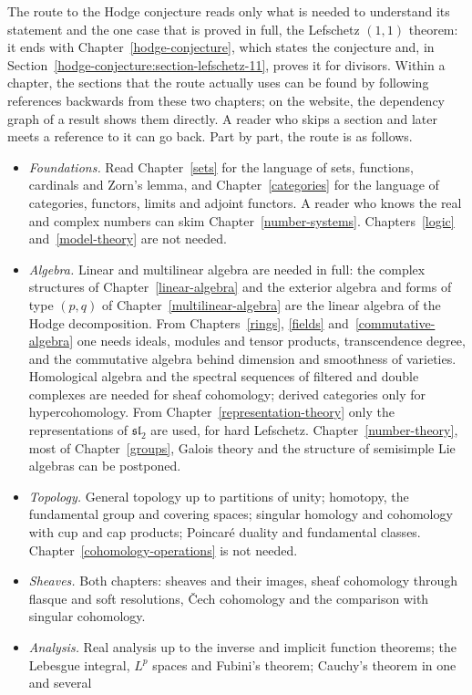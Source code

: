 The route to the Hodge conjecture reads only what is needed to understand its statement and the one case that is proved in full, the Lefschetz $(1,1)$ theorem: it ends with
Chapter~\ref{hodge-conjecture}, which states the conjecture and, in Section~\ref{hodge-conjecture:section-lefschetz-11}, proves it for divisors. Within a chapter, the sections that the route
actually uses can be found by following references backwards from these two chapters; on the website, the dependency graph of a result shows them directly. A reader who
skips a section and later meets a reference to it can go back. Part by part, the route is as follows.
\begin{itemize}
\item \emph{Foundations.} Read Chapter~\ref{sets} for the language of sets, functions, cardinals and Zorn's lemma, and Chapter~\ref{categories} for the language of categories,
functors, limits and adjoint functors. A reader who knows the real and complex numbers can skim Chapter~\ref{number-systems}. Chapters~\ref{logic} and~\ref{model-theory} are
not needed.
\item \emph{Algebra.} Linear and multilinear algebra are needed in full: the complex structures of Chapter~\ref{linear-algebra} and the exterior algebra and forms of type $(p,q)$ of
Chapter~\ref{multilinear-algebra} are the linear algebra of the Hodge decomposition. From Chapters~\ref{rings}, \ref{fields} and~\ref{commutative-algebra} one needs ideals,
modules and tensor products, transcendence degree, and the commutative algebra behind dimension and smoothness of varieties. Homological algebra and the spectral sequences of filtered
and double complexes are needed for sheaf cohomology; derived categories only for hypercohomology. From Chapter~\ref{representation-theory} only the representations of
$\mathfrak{sl}_2$ are used, for hard Lefschetz. Chapter~\ref{number-theory}, most of Chapter~\ref{groups}, Galois theory and the structure of semisimple Lie algebras can be
postponed.
\item \emph{Topology.} General topology up to partitions of unity; homotopy, the fundamental group and covering spaces; singular homology and cohomology with cup and cap products;
Poincar\'e duality and fundamental classes. Chapter~\ref{cohomology-operations} is not needed.
\item \emph{Sheaves.} Both chapters: sheaves and their images, sheaf cohomology through flasque and soft resolutions, \v{C}ech cohomology and the comparison with singular cohomology.
\item \emph{Analysis.} Real analysis up to the inverse and implicit function theorems; the Lebesgue integral, $L^p$ spaces and Fubini's theorem; Cauchy's theorem in one and several

\end{itemize}
